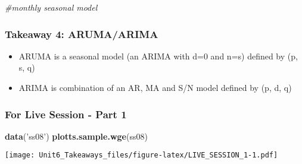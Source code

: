 \documentclass[]{article}
\newenvironment{Shaded}{\begin{snugshade}}{\end{snugshade}}
\newcommand{\CommentTok}[1]{\textcolor[rgb]{0.56,0.35,0.01}{\textit{#1}}}
\newcommand{\KeywordTok}[1]{\textcolor[rgb]{0.13,0.29,0.53}{\textbf{#1}}}
\newcommand{\NormalTok}[1]{#1}
\newcommand{\StringTok}[1]{\textcolor[rgb]{0.31,0.60,0.02}{#1}}
\providecommand{\tightlist}{%
  \setlength{\itemsep}{0pt}\setlength{\parskip}{0pt}}
\begin{document}
\begin{Shaded}
\begin{Highlighting}[]
\CommentTok{#monthly seasonal model}
\end{Highlighting}
\end{Shaded}

\hypertarget{takeaway-4-arumaarima}{%
\subsubsection{Takeaway 4: ARUMA/ARIMA}\label{takeaway-4-arumaarima}}

\begin{itemize}
\tightlist
\item
  ARUMA is a seasonal model (an ARIMA with d=0 and n=s) defined by (p,
  s, q)
\item
  ARIMA is combination of an AR, MA and S/N model defined by (p, d, q)
\end{itemize}

\hypertarget{for-live-session---part-1}{%
\subsubsection{For Live Session - Part
1}\label{for-live-session---part-1}}

\begin{Shaded}
\begin{Highlighting}[]
\KeywordTok{data}\NormalTok{(}\StringTok{'ss08'}\NormalTok{)}
\KeywordTok{plotts.sample.wge}\NormalTok{(ss08)}
\end{Highlighting}
\end{Shaded}

\texttt{[image: Unit6\_Takeaways\_files/figure-latex/LIVE\_SESSION\_1-1.pdf]}
\end{document}
